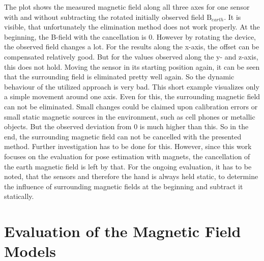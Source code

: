 The plot shows the measured magnetic field along all three axes for one sensor with and without subtracting the rotated initially observed field $ \mathrm{B}_{earth} $. It is visible, that unfortunately the elimination method does not work properly. At the beginning, the B-field with the cancellation is 0. However by rotating the device, the observed field changes a lot. For the results along the x-axis, the offset can be compensated relatively good. But for the values observed along the y- and z-axis, this does not hold. Moving the sensor in its starting position again, it can be seen that the surrounding field is eliminated pretty well again. So the dynamic behaviour of the utilized approach is very bad. This short example visualizes only a simple movement around one axis. Even for this, the surrounding magnetic field can not be eliminated. Small changes could be claimed upon calibration errors or small static magnetic sources in the environment, such as cell phones or metallic objects. But the observed deviation from 0 is much higher than this. So in the end, the surrounding magnetic field can not be cancelled with the presented method. Further investigation has to be done for this. However, since this work focuses on the evaluation for pose estimation with magnets, the cancellation of the earth magnetic field is left by that. For the ongoing evaluation, it has to be noted, that the sensors and therefore the hand is always held static, to determine the influence of surrounding magnetic fields at the beginning and subtract it statically.

\FloatBarrier
\section{Evaluation of the Magnetic Field Models} \label{sec:modelDif}


